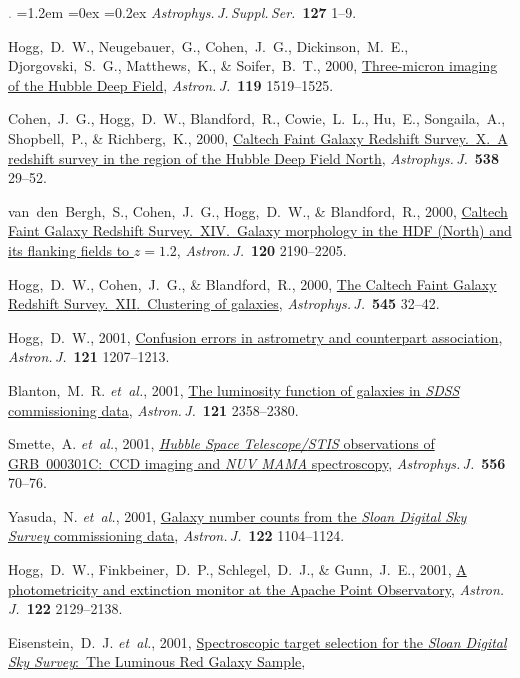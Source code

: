 \documentclass[10pt,letterpaper]{article}
\newcommand{\acronym}[1]{{\small{#1}}}
\newcommand{\foreign}[1]{\textsl{#1}}
\newcommand{\etal}{\foreign{et~al.}}
\newcommand{\project}[1]{\textsl{#1}}
\newcommand{\doi}[2]{\href{http://dx.doi.org/#1}{{#2}}}
\newcommand{\deemph}[1]{\textcolor{grey}{\footnotesize{#1}}}
\newcommand{\pubnumber}[1]{\deemph{{#1}.}}
\newcounter{refpubnum}
\newcommand{\hogglist}{%
    \rightmargin=0in
    \leftmargin=1.2em
    \topsep=0ex
    \partopsep=0pt
    \itemsep=0.2ex
    \parsep=0pt
    \itemindent=-1.0\leftmargin
    \listparindent=0.0\leftmargin
    \settowidth{\labelsep}{~}
    \usecounter{refpubnum}
  }
\begin{document}
\begin{list}{\pubnumber{\therefpubnum}}{\hogglist}
\textit{Astrophys.\,J.\,Suppl.\,Ser.}\ \textbf{127} 1--9.
\item
Hogg,~D.~W., Neugebauer,~G., Cohen,~J.~G., Dickinson,~M.~E., Djorgovski,~S.~G., Matthews,~K., \& Soifer,~B.~T., 2000,
\doi{10.1086/301309}{Three-micron imaging of the Hubble Deep Field},
\textit{Astron.\,J.}\ \textbf{119} 1519--1525.
\item\label{pub:Cohen2000}
Cohen,~J.~G., Hogg,~D.~W., Blandford,~R., Cowie,~L.~L., Hu,~E., Songaila,~A., Shopbell,~P., \& Richberg,~K., 2000,
\doi{10.1086/309096}{Caltech Faint Galaxy Redshift Survey.\ \acronym{X}.\ A redshift survey in the region of the Hubble Deep Field North},
\textit{Astrophys.\,J.}\ \textbf{538} 29--52.
\item
van~den~Bergh,~S., Cohen,~J.~G., Hogg,~D.~W., \& Blandford,~R., 2000,
\doi{10.1086/316828}{Caltech Faint Galaxy Redshift Survey.\ \acronym{XIV}.\ Galaxy morphology in the HDF (North) and its flanking fields to $z=1.2$},
\textit{Astron.\,J.}\ \textbf{120} 2190--2205.
\item
Hogg,~D.~W., Cohen,~J.~G., \& Blandford,~R., 2000,
\doi{10.1086/317779}{The Caltech Faint Galaxy Redshift Survey.\ \acronym{XII}.\ Clustering of galaxies},
\textit{Astrophys.\,J.}\ \textbf{545} 32--42.
\item
Hogg,~D.~W., 2001,
\doi{10.1086/318736}{Confusion errors in astrometry and counterpart association},
\textit{Astron.\,J.}\ \textbf{121} 1207--1213.
\item
Blanton,~M.~R. \etal, 2001,
\doi{10.1086/320405}{The luminosity function of galaxies in \project{\acronym{SDSS}} commissioning data},
\textit{Astron.\,J.}\ \textbf{121} 2358--2380.
\item
Smette,~A. \etal, 2001,
\doi{10.1086/321585}{\project{Hubble Space Telescope/\acronym{STIS}} observations of \acronym{GRB~000301C}:\ \acronym{CCD} imaging and \project{\acronym{NUV MAMA}} spectroscopy},
\textit{Astrophys.\,J.}\ \textbf{556} 70--76.
\item
Yasuda,~N. \etal, 2001,
\doi{10.1086/322093}{Galaxy number counts from the \project{Sloan Digital Sky Survey} commissioning data},
\textit{Astron.\,J.}\ \textbf{122} 1104--1124.
\item\label{pub:Hogg2001}
Hogg,~D.~W., Finkbeiner,~D.~P., Schlegel,~D.~J., \& Gunn,~J.~E., 2001,
\doi{10.1086/323103}{A photometricity and extinction monitor at the Apache Point Observatory},
\textit{Astron.\,J.}\ \textbf{122} 2129--2138.
\item
Eisenstein,~D.~J. \etal, 2001,
\doi{10.1086/323717}{Spectroscopic target selection for the \project{Sloan Digital Sky Survey}:\ The Luminous Red Galaxy Sample},

\end{list}
\end{document}
